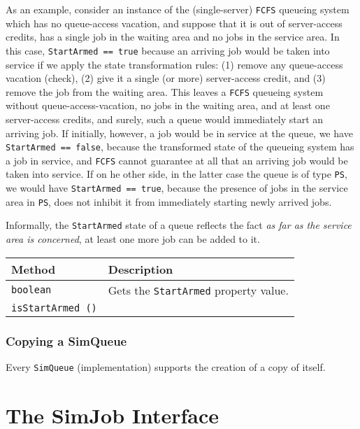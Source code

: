 \documentclass[12pt]{book}
\begin{document}
As an example, consider an instance of the
  (single-server) \lstinline-FCFS- queueing system
  which has no queue-access vacation,
  and suppose that it is out of server-access credits,
  has a single job in the waiting area
  and no jobs in the service area.
In this case, \lstinline-StartArmed == true- because
  an arriving job would be taken into service
  if we apply the state transformation rules:
  (1) remove any queue-access vacation (check),
  (2) give it a single (or more) server-access credit,
  and (3) remove the job from the waiting area.
This leaves a \lstinline-FCFS- queueing system without
  queue-access-vacation, no jobs in the waiting area,
  and at least one server-access credits,
  and surely, such a queue would immediately start an arriving job.
If initially, however, a job would be in service at the queue,
  we have \lstinline-StartArmed == false-,
  because the transformed state of the queueing system has
  a job in service,
  and \lstinline-FCFS- cannot guarantee at all that
  an arriving job would be taken into service.
If on he other side, in the latter case
  the queue is of type \lstinline-PS-,
  we would have \lstinline-StartArmed == true-,
  because the presence of jobs in the service area in \lstinline-PS-,
  does not inhibit it from immediately starting newly arrived jobs.
 
Informally, the \lstinline-StartArmed- state of a queue
  reflects the fact {\em as far as the service area is concerned},
  at least one more job can be added to it.

\begin{tabular}{|l|l|}
  \hline
  {\bf Method} & {\bf Description} \\
  \hline
  \lstinline[basicstyle=\footnotesize]!boolean!
    & Gets the \lstinline!StartArmed! property value.
    \\
  \lstinline[basicstyle=\footnotesize]!isStartArmed ()!
    &
    \\ \hline
\end{tabular}

\subsubsection{Copying a SimQueue}

Every \lstinline|SimQueue| (implementation) supports the creation of a copy
  of itself.

\section{The SimJob Interface}
\end{document}
